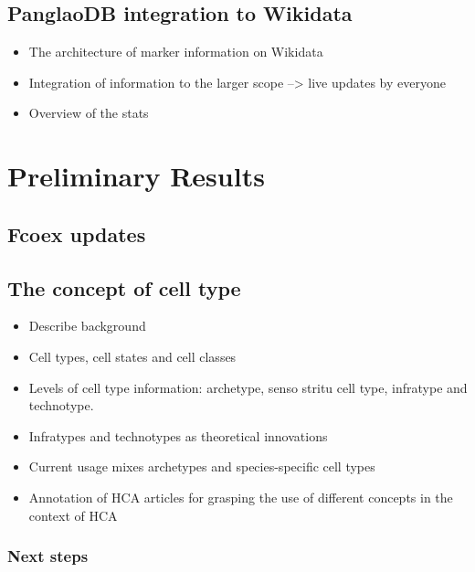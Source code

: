 \hypertarget{panglaodb-integration-to-wikidata-1}{%
\subsection{PanglaoDB integration to Wikidata}\label{panglaodb-integration-to-wikidata-1}}

\begin{itemize}
\tightlist
\item
  The architecture of marker information on Wikidata
\item
  Integration of information to the larger scope --\textgreater{} live updates by everyone
\item
  Overview of the stats
\end{itemize}

\hypertarget{preliminary-results-2}{%
\section{Preliminary Results}\label{preliminary-results-2}}

\hypertarget{fcoex-updates-1}{%
\subsection{Fcoex updates}\label{fcoex-updates-1}}

\hypertarget{the-concept-of-cell-type-1}{%
\subsection{The concept of cell type}\label{the-concept-of-cell-type-1}}

\begin{itemize}
\tightlist
\item
  Describe background
\item
  Cell types, cell states and cell classes
\item
  Levels of cell type information: archetype, senso stritu cell type, infratype and technotype.
\item
  Infratypes and technotypes as theoretical innovations
\item
  Current usage mixes archetypes and species-specific cell types
\item
  Annotation of HCA articles for grasping the use of different concepts in the context of HCA
\end{itemize}

\hypertarget{next-steps-2}{%
\subsubsection{Next steps}\label{next-steps-2}}

